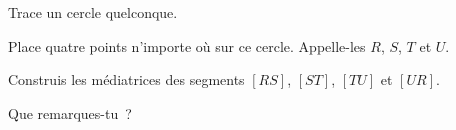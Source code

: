 \begin{myenumerate}
\item Trace un cercle quelconque.
\item Place quatre points n'importe où sur ce cercle. Appelle-les $R$, $S$, $T$ et $U$.
\item Construis les médiatrices des segments $[RS]$, $[ST]$, $[TU]$ et $[UR]$.
\item Que remarques-tu ?
\end{myenumerate}